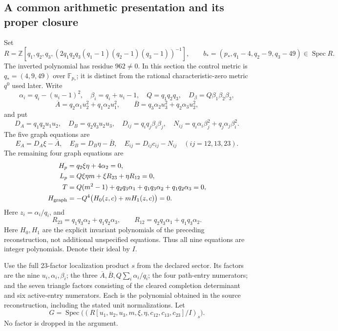 \documentclass[11pt,a4paper]{article}
\theoremstyle{remark}\newtheorem{remark}[theorem]{Remark}
\newcommand{\Spec}{\operatorname{Spec}}\newcommand{\tr}{\operatorname{tr}}
\newcommand{\Ab}{\overline A}\newcommand{\Bb}{\overline B}
\begin{document}
\subsection{A common arithmetic presentation and its proper closure}
\label{generic:model}
Set
\[
 R=\mathbb Z[q_1,q_2,q_3,
 (2q_1q_2q_3(q_1-1)(q_2-1)(q_3-1))^{-1}],\qquad
 b_*=(p_*,q_1-4,q_2-9,q_3-49)\in\Spec R.
\]
The inverted polynomial has residue $962\ne0$. In this section the
control metric is $q_*=(4,9,49)$ over $\mathbb F_{p_*}$; it is distinct
from the rational characteristic-zero metric $q^0$ used later.
Write
\[
 \alpha_i=q_i-(u_i-1)^2,\quad \beta_i=q_i+u_i-1,\quad Q=q_1q_2q_3,
 \quad D_\beta=Q\beta_1\beta_2\beta_3,
\]
\[
 \Ab=q_2\alpha_1u_2^2+q_1\alpha_2u_1^2,\qquad
 \Bb=q_3\alpha_2u_3^2+q_2\alpha_3u_2^2,
\]
and put
\[
 D_A=q_1q_2u_1u_2,\quad D_B=q_2q_3u_2u_3,\quad
 D_{ij}=q_iq_j\beta_i\beta_j,
 \quad N_{ij}=q_i\alpha_i\beta_j^2+q_j\alpha_j\beta_i^2.
\]
The five graph equations are
\[
 E_A=D_A\xi-\Ab,\quad E_B=D_B\eta-\Bb,\quad
 E_{ij}=D_{ij}c_{ij}-N_{ij}\quad(ij=12,13,23).
\]
The remaining four graph equations are
\begin{align}
 H_p&=q_2\xi\eta+4\alpha_2=0,\label{generic:Hp}\\
 L_p&=Q\xi\eta m+\xi R_{23}+\eta R_{12}=0,\label{generic:Lp}\\
 T&=Q(m^2-1)+q_2q_3\alpha_1+q_1q_3\alpha_2+q_1q_2\alpha_3=0,
 \label{generic:top}\\
 H_{\rm graph}&=-Q^4\bigl(H_0(z,c)+mH_1(z,c)\bigr)=0.\label{generic:trianglegraph}
\end{align}
Here $z_i=\alpha_i/q_i$, and
\[
 R_{23}=q_1q_3\alpha_2+q_1q_2\alpha_3,\qquad
 R_{12}=q_2q_3\alpha_1+q_1q_3\alpha_2.
\]
Here $H_0,H_1$ are the explicit invariant polynomials of the preceding
reconstruction, not additional unspecified equations. Thus all nine
equations are integer polynomials. Denote their ideal by $I$.

Use the full 23-factor localization product $s$ from the declared sector.
Its factors are the nine $u_i,\alpha_i,\beta_i$; the three
$\Ab,\Bb,Q\sum_i\alpha_i/q_i$; the four path-entry numerators; and
the seven triangle factors consisting of the cleared completion
determinant and six active-entry numerators. Each is the polynomial
obtained in the source reconstruction, including the stated unit
normalizations. Let
\[
 G=\Spec\bigl((R[u_1,u_2,u_3,m,\xi,\eta,c_{12},c_{13},c_{23}]/I)_s\bigr).
\]
No factor is dropped in the argument.
\end{document}
